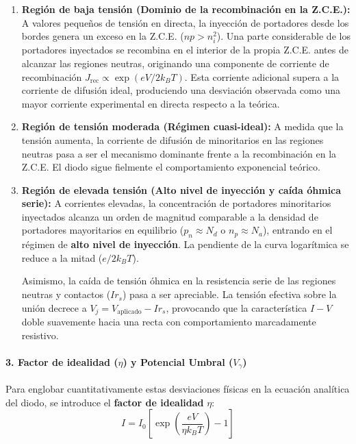 \begin{enumerate}[label=\alph*)]
    \item \textbf{Región de baja tensión (Dominio de la recombinación en la Z.C.E.):}
    A valores pequeños de tensión en directa, la inyección de portadores desde los bordes genera un exceso en la Z.C.E. ($n p > n_i^2$). Una parte considerable de los portadores inyectados se recombina en el interior de la propia Z.C.E. antes de alcanzar las regiones neutras, originando una componente de corriente de recombinación $J_{\text{rec}} \propto \exp(e V / 2 k_B T)$. Esta corriente adicional supera a la corriente de difusión ideal, produciendo una desviación observada como una mayor corriente experimental en directa respecto a la teórica.

    \item \textbf{Región de tensión moderada (Régimen cuasi-ideal):}
    A medida que la tensión aumenta, la corriente de difusión de minoritarios en las regiones neutras pasa a ser el mecanismo dominante frente a la recombinación en la Z.C.E. El diodo sigue fielmente el comportamiento exponencial teórico.

    \item \textbf{Región de elevada tensión (Alto nivel de inyección y caída óhmica serie):}
    A corrientes elevadas, la concentración de portadores minoritarios inyectados alcanza un orden de magnitud comparable a la densidad de portadores mayoritarios en equilibrio ($p_n \approx N_d$ o $n_p \approx N_a$), entrando en el régimen de \textbf{alto nivel de inyección}. La pendiente de la curva logarítmica se reduce a la mitad ($e / 2 k_B T$). 

    Asimismo, la caída de tensión óhmica en la resistencia serie de las regiones neutras y contactos ($I r_s$) pasa a ser apreciable. La tensión efectiva sobre la unión decrece a $V_j = V_{\text{aplicado}} - I r_s$, provocando que la característica $I-V$ doble suavemente hacia una recta con comportamiento marcadamente resistivo.
\end{enumerate}

\newpage
\paragraph{3. Factor de idealidad ($\eta$) y Potencial Umbral ($V_\gamma$)}
Para englobar cuantitativamente estas desviaciones físicas en la ecuación analítica del diodo, se introduce el \textbf{factor de idealidad} $\eta$:
\[
I = I_0 \left[ \exp\left(\frac{e V}{\eta k_B T}\right) - 1 \right]
\]

